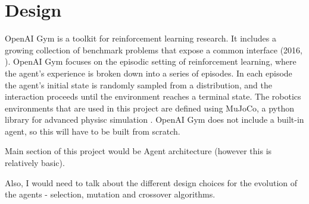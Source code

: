 \chapter{Design}

OpenAI Gym is a toolkit for reinforcement learning research. It includes a growing collection of benchmark problems that expose a common interface (2016, \cite{gym}). OpenAI Gym focuses on the episodic setting of reinforcement learning, where the agent's experience is broken down into a series of episodes. In each episode the agent's initial state is randomly sampled from a distribution, and the interaction proceeds until the environment reaches a terminal state. The robotics environments that are used in this project are defined using MuJoCo, a python library for advanced physisc simulation \cite{mujoco}. OpenAI Gym does not include a built-in agent, so this will have to be built from scratch.



Main section of this project would be Agent architecture (however this is relatively basic).

Also, I would need to talk about the different design choices for the evolution of the agents - selection, mutation and crossover algorithms.
